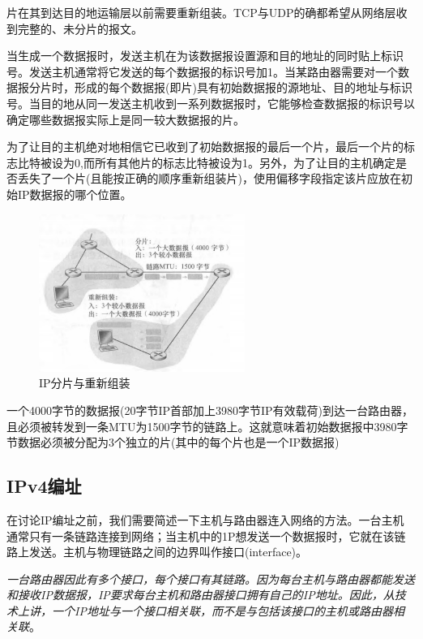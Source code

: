    片在其到达目的地运输层以前需要重新组装。TCP与UDP的确都希望从网络层收到完整的、未分片的报文。

    当生成一个数据报时，发送主机在为该数据报设置源和目的地址的同时贴上标识号。发送主机通常将它发送的每个数据报的标识号加1。当某路由器需要对一个数据报分片时，形成的每个数据报(即片)具有初始数据报的源地址、目的地址与标识号。当目的地从同一发送主机收到一系列数据报时，它能够检查数据报的标识号以确定哪些数据报实际上是同一较大数据报的片。

    为了让目的主机绝对地相信它已收到了初始数据报的最后一个片，最后一个片的标志比特被设为0,而所有其他片的标志比特被设为1。另外，为了让目的主机确定是否丢失了一个片(且能按正确的顺序重新组装片)，使用偏移字段指定该片应放在初始IP数据报的哪个位置。

\begin{figure}[!htbp]
    \centering
    \includegraphics[width=0.6\textwidth]{image/chapter04/IP分片与重新组装.png}
    \caption{IP分片与重新组装}
\end{figure}

    一个4000字节的数据报(20字节IP首部加上3980字节IP有效载荷)到达一台路由器，且必须被转发到一条MTU为1500字节的链路上。这就意味着初始数据报中3980字节数据必须被分配为3个独立的片(其中的每个片也是一个IP数据报)

\subsection{IPv4编址}

    在讨论IP编址之前，我们需要简述一下主机与路由器连入网络的方法。一台主机通常只有一条链路连接到网络；当主机中的1P想发送一个数据报时，它就在该链路上发送。主机与物理链路之间的边界叫作接口(interface)。

    \emph{一台路由器因此有多个接口，每个接口有其链路。因为每台主机与路由器都能发送和接收IP数据报，IP要求每台主机和路由器接口拥有自己的IP地址。因此，从技术上讲，一个IP地址与一个接口相关联，而不是与包括该接口的主机或路由器相关联}。

